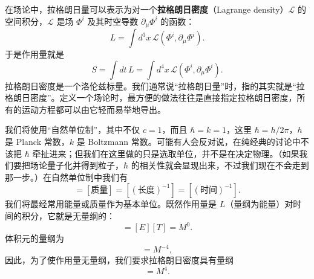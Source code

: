 在场论中，拉格朗日量可以表示为对一个\textbf{拉格朗日密度}（Lagrange density）$\mathcal{L}$ 的空间积分，$\mathcal{L}$ 是场 $\Phi^{i}$ 及其时空导数 $\partial_{\mu}\Phi^{i}$ 的函数：
\begin{equation*}
L = \int d^{3}x\, \mathcal{L}(\Phi^{i}, \partial_{\mu}\Phi^{i}).
\tag{1.131}
\end{equation*}
于是作用量就是
\begin{equation*}
S = \int dt\, L = \int d^{4}x\, \mathcal{L}(\Phi^{i}, \partial_{\mu}\Phi^{i}).
\tag{1.132}
\end{equation*}
拉格朗日密度是一个洛伦兹标量。我们通常说“拉格朗日量”时，指的其实就是“拉格朗日密度”。定义一个场论时，最方便的做法往往是直接指定拉格朗日密度，所有的运动方程都可以由它轻而易举地导出。

我们将使用“自然单位制”，其中不仅 $c=1$，而且 $\hbar=k=1$，这里 $\hbar=h/2\pi$，$h$ 是 Planck 常数，$k$ 是 Boltzmann 常数。可能有人会反对说，在纯经典的讨论中不该把 $\hbar$ 牵扯进来；但我们在这里做的只是选取单位，并不是在决定物理。（如果我们要把场论量子化并得到粒子，$\hbar$ 的相关性就会显现出来，不过我们现在不会走到那一步。）在自然单位制中我们有
\begin{equation*}
[\text{能量}] = [\text{质量}] = [(\text{长度})^{-1}] = [(\text{时间})^{-1}].
\tag{1.133}
\end{equation*}
我们将最经常用能量或质量作为基本单位。既然作用量是 $L$（量纲为能量）对时间的积分，它就是无量纲的：
\begin{equation*}
[S] = [E][T] = M^{0}.
\tag{1.134}
\end{equation*}
体积元的量纲为
\begin{equation*}
[d^{4}x] = M^{-4},
\tag{1.135}
\end{equation*}
因此，为了使作用量无量纲，我们要求拉格朗日密度具有量纲
\begin{equation*}
[\mathcal{L}] = M^{4}.
\tag{1.136}
\end{equation*}

